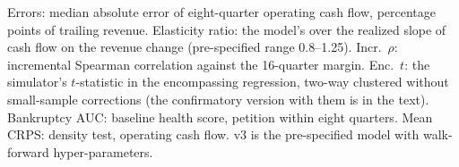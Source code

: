 \documentclass[preprint,12pt,authoryear]{elsarticle}
\begin{document}
\begin{table}[t]
\centering\scriptsize
\caption{The specifications on the same firm-years}
\label{tab:specs}

\par\smallskip
\begin{minipage}{\linewidth}\footnotesize
Errors: median absolute error of eight-quarter operating cash flow, percentage points of trailing revenue. Elasticity ratio: the model's over the realized slope of cash flow on the revenue change (pre-specified range 0.8--1.25). Incr.\ $\rho$: incremental Spearman correlation against the 16-quarter margin. Enc.\ $t$: the simulator's $t$-statistic in the encompassing regression, two-way clustered without small-sample corrections (the confirmatory version with them is in the text). Bankruptcy AUC: baseline health score, petition within eight quarters. Mean CRPS: density test, operating cash flow. v3 is the pre-specified model with walk-forward hyper-parameters.
\end{minipage}
\end{table}
\end{document}
